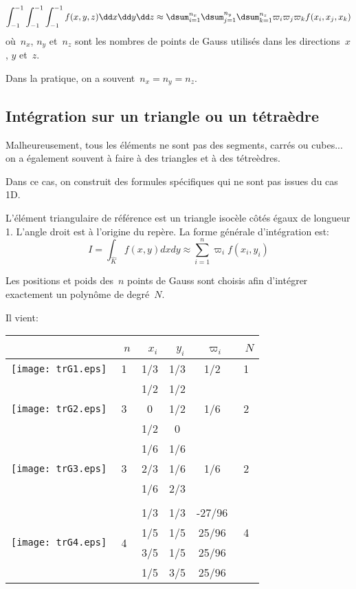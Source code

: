 \begin{equation} \int_{-1}^{-1}\int_{-1}^{-1}\int_{-1}^{-1} f(x,y,z)\dd x\dd y\dd z \approx
\dsum_{i=1}^{n_x}\dsum_{j=1}^{n_y}\dsum_{k=1}^{n_z} \varpi_i\varpi_j\varpi_k f(x_i,x_j,x_k)\end{equation}
où~$n_x$, $n_y$ et~$n_z$ sont les nombres de points de Gauss utilisés dans
les directions~$x$, $y$ et~$z$.

Dans la pratique, on a souvent~$n_x=n_y=n_z$.


\medskip
\subsection*{Intégration sur un triangle ou un tétraèdre}

Malheureusement, tous les éléments ne sont pas des segments, carrés ou cubes...
on a également souvent à faire à des triangles et à des tétreèdres.

Dans ce cas, on construit des formules spécifiques qui ne sont pas issues du cas 1D.

L'élément triangulaire de référence est un triangle isocèle côtés égaux
de longueur 1. L'angle droit est à l'origine du repère. La forme générale d'intégration est:
\begin{equation}
I=\int_{\hat{K}} f(x,y)dxdy \approx \sum_{i=1}^n \varpi_if(x_i,y_i)
\end{equation}

\medskip
Les positions et poids des~$n$ points de Gauss 
sont choisis afin d'intégrer exactement un polynôme de degré~$N$.

Il vient:
\begin{center}
\begin{tabular}{cccccc}
 &~$n$ &~$x_i$ &~$y_i$ &~$\varpi_i$ &~$N$\\
\hline
\texttt{[image: trG1.eps]} & 1 & 1/3 & 1/3 & 1/2 & 1\\
\hline
\multirow{3}{*}{\texttt{[image: trG2.eps]}} &
\multirow{3}{*}{3} & 1/2 & 1/2 & \multirow{3}{*}{1/6} & \multirow{3}{*}{2}\\[+2mm]
&&0&1/2&&\\[+2mm]
&&1/2&0&&\\[+2mm]
\hline
\multirow{3}{*}{\texttt{[image: trG3.eps]}} &
\multirow{3}{*}{3} & 1/6 & 1/6 & \multirow{3}{*}{1/6} & \multirow{3}{*}{2}\\[+2mm]
&&2/3 & 1/6 &&\\[+2mm]
&&1/6&2/3&&\\[+2mm]
\\
\hline
\multirow{4}{*}{\texttt{[image: trG4.eps]}} & 
\multirow{4}{*}{4} & 1/3 & 1/3 & -27/96 & \multirow{3}{*}{4}\\[+2mm]
&&1/5&1/5&25/96&\\[+2mm]
&&3/5&1/5&25/96&\\[+2mm]
&&1/5&3/5&25/96&\\[+2mm]
\end{tabular}
\end{center}

